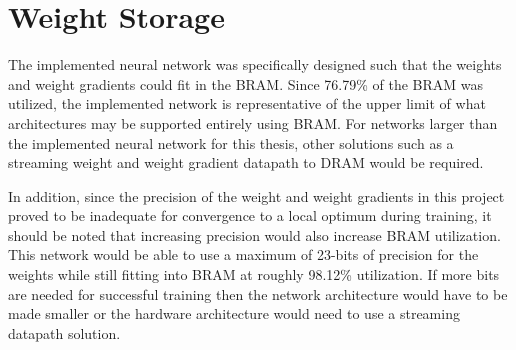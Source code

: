 \section{Weight Storage}
The implemented neural network was specifically designed such that the weights and weight gradients could fit in the BRAM. Since 76.79\% of the BRAM was utilized, the implemented network is representative of the upper limit of what architectures may be supported entirely using BRAM. For networks larger than the implemented neural network for this thesis, other solutions such as a streaming weight and weight gradient datapath to DRAM would be required. 

In addition, since the precision of the weight and weight gradients in this project proved to be inadequate for convergence to a local optimum during training, it should be noted that increasing precision would also increase BRAM utilization. This network would be able to use a maximum of 23-bits of precision for the weights while still fitting into BRAM at roughly 98.12\% utilization. If more bits are needed for successful training then the network architecture would have to be made smaller or the hardware architecture would need to use a streaming datapath solution.
